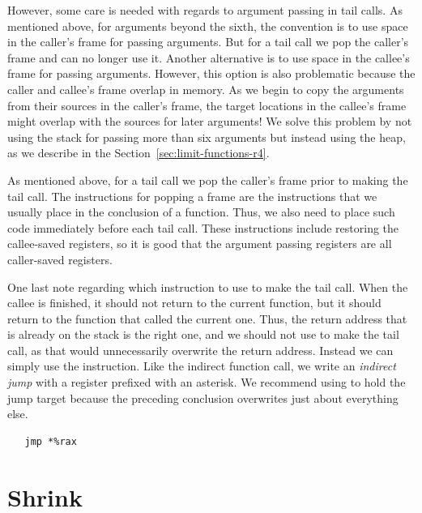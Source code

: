 \documentclass[11pt]{book}
\newcommand{\ocaml}[1]{{\color{blue}{#1}}}
\begin{document}
However, some care is needed with regards to argument passing in tail
calls.  As mentioned above, for arguments beyond the sixth, the
convention is to use space in the caller's frame for passing
arguments.  But for a tail call we pop the caller's frame and can no
longer use it.  Another alternative is to use space in the callee's
frame for passing arguments. However, this option is also problematic
because the caller and callee's frame overlap in memory.  As we begin
to copy the arguments from their sources in the caller's frame, the
target locations in the callee's frame might overlap with the sources
for later arguments! We solve this problem by not using the stack for
passing more than six arguments but instead using the heap, as we
describe in the Section~\ref{sec:limit-functions-r4}.
\ocaml{Since we won't do this tail-call optimization, we could
  follow the convention of using space in the caller's frame for
  passing arguments beyond the sixth one. But is is easer to just
  prohibit functions with more than six arguments, which we do
  in the typechecker.}

As mentioned above, for a tail call we pop the caller's frame prior to
making the tail call. The instructions for popping a frame are the
instructions that we usually place in the conclusion of a
function. Thus, we also need to place such code immediately before
each tail call. These instructions include restoring the callee-saved
registers, so it is good that the argument passing registers are all
caller-saved registers.

One last note regarding which instruction to use to make the tail
call. When the callee is finished, it should not return to the current
function, but it should return to the function that called the current
one. Thus, the return address that is already on the stack is the
right one, and we should not use  to make the tail call, as
that would unnecessarily overwrite the return address. Instead we can
simply use the  instruction. Like the indirect function call,
we write an \emph{indirect jump} with a register
prefixed with an asterisk.  We recommend using  to hold the
jump target because the preceding conclusion overwrites just about
everything else.
\begin{lstlisting}
   jmp *%rax
\end{lstlisting}

\section{Shrink \LangFun{}}
\label{sec:shrink-r4}
\end{document}
